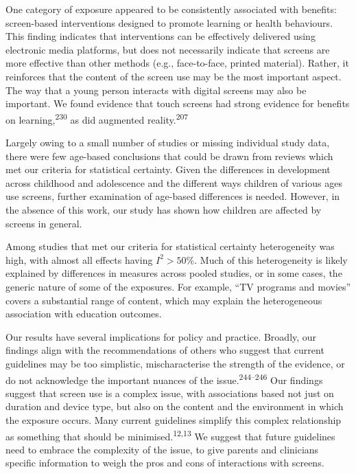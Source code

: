 \documentclass[
  english,
  man]{apa6}
\begin{document}
One category of exposure appeared to be consistently associated with benefits: screen-based interventions designed to promote learning or health behaviours.
This finding indicates that interventions can be effectively delivered using electronic media platforms, but does not necessarily indicate that screens are more effective than other methods (e.g., face-to-face, printed material).
Rather, it reinforces that the content of the screen use may be the most important aspect.
The way that a young person interacts with digital screens may also be important.
We found evidence that touch screens had strong evidence for benefits on learning,\textsuperscript{230} as did augmented reality.\textsuperscript{207}

Largely owing to a small number of studies or missing individual study data, there were few age-based conclusions that could be drawn from reviews which met our criteria for statistical certainty.
Given the differences in development across childhood and adolescence and the different ways children of various ages use screens, further examination of age-based differences is needed.
However, in the absence of this work, our study has shown how children are affected by screens in general.

Among studies that met our criteria for statistical certainty heterogeneity was high, with almost all effects having \(I^2 > 50\%\).
Much of this heterogeneity is likely explained by differences in measures across pooled studies, or in some cases, the generic nature of some of the exposures.
For example, ``TV programs and movies'' covers a substantial range of content, which may explain the heterogeneous association with education outcomes.

Our results have several implications for policy and practice.
Broadly, our findings align with the recommendations of others who suggest that current guidelines may be too simplistic, mischaracterise the strength of the evidence, or do not acknowledge the important nuances of the issue.\textsuperscript{244--246}
Our findings suggest that screen use is a complex issue, with associations based not just on duration and device type, but also on the content and the environment in which the exposure occurs.
Many current guidelines simplify this complex relationship as something that should be minimised.\textsuperscript{12,13}
We suggest that future guidelines need to embrace the complexity of the issue, to give parents and clinicians specific information to weigh the pros and cons of interactions with screens.
\end{document}
